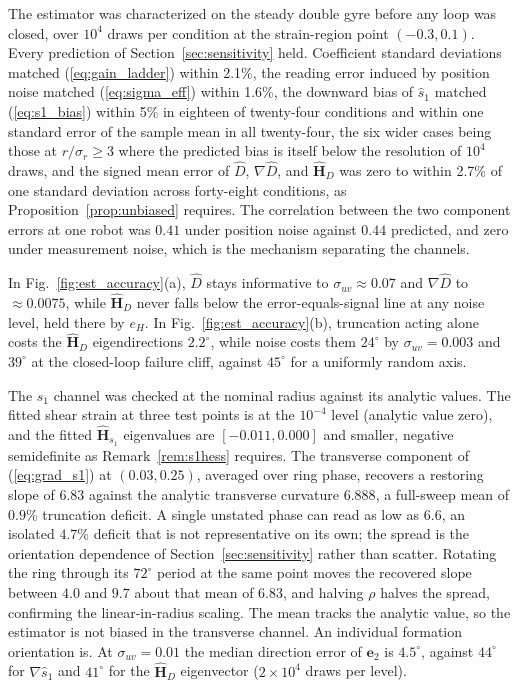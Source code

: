 \documentclass[lettersize,journal]{IEEEtran}
\begin{document}
The estimator was characterized on the steady double gyre before any loop
was closed, over $10^4$ draws per condition at the strain-region point
$(-0.3, 0.1)$. Every prediction of Section~\ref{sec:sensitivity} held.
Coefficient standard deviations matched (\ref{eq:gain_ladder}) within
2.1\%, the reading error induced by position noise matched
(\ref{eq:sigma_eff}) within 1.6\%, the downward bias of $\hat{s}_1$ matched
(\ref{eq:s1_bias}) within 5\% in eighteen of twenty-four conditions and
within one standard error of the sample mean in all twenty-four, the six
wider cases being those at $r/\sigma_r \geq 3$ where the predicted bias
is itself below the resolution of $10^4$ draws, and
the signed mean error of $\hat{D}$, $\nabla\hat{D}$, and
$\hat{\mathbf{H}}_D$ was zero to within 2.7\% of one standard deviation
across forty-eight conditions, as Proposition~\ref{prop:unbiased} requires.
The correlation between the two component errors at one robot was $0.41$
under position noise against $0.44$ predicted, and zero under measurement
noise, which is the mechanism separating the channels.

In Fig.~\ref{fig:est_accuracy}(a), $\hat{D}$ stays informative to
$\sigma_{uv} \approx 0.07$ and $\nabla\hat{D}$ to $\approx 0.0075$, while
$\hat{\mathbf{H}}_D$ never falls below the error-equals-signal line at any
noise level, held there by $e_H$. In Fig.~\ref{fig:est_accuracy}(b),
truncation acting alone costs the $\hat{\mathbf{H}}_D$ eigendirections
$2.2^\circ$, while noise costs them $24^\circ$ by $\sigma_{uv} = 0.003$ and
$39^\circ$ at the closed-loop failure cliff, against $45^\circ$ for a
uniformly random axis.

The $s_1$ channel was checked at the nominal radius against its analytic
values. The fitted shear strain at three test points is at the $10^{-4}$
level (analytic value zero), and the fitted $\hat{\mathbf{H}}_{s_1}$
eigenvalues are $[-0.011, 0.000]$ and smaller, negative semidefinite as
Remark~\ref{rem:s1hess} requires. The transverse component of
(\ref{eq:grad_s1}) at $(0.03, 0.25)$, averaged over ring phase, recovers a
restoring slope of $6.83$ against the analytic transverse curvature
$6.888$, a full-sweep mean of $0.9$\% truncation deficit. A single unstated
phase can read as low as $6.6$, an isolated $4.7$\% deficit that is not
representative on its own; the spread is the orientation dependence of
Section~\ref{sec:sensitivity} rather than scatter. Rotating the ring
through its $72^\circ$ period at the same point moves the recovered slope
between $4.0$ and $9.7$ about that mean of $6.83$, and halving $\rho$ halves
the spread, confirming the linear-in-radius scaling. The mean tracks the
analytic value, so the estimator is not biased in the transverse channel.
An individual formation orientation is. At $\sigma_{uv} = 0.01$ the median
direction error of $\mathbf{e}_2$ is $4.5^\circ$, against $44^\circ$ for
$\nabla\hat{s}_1$ and $41^\circ$ for the $\hat{\mathbf{H}}_D$ eigenvector
($2\times 10^4$ draws per level).
\end{document}
